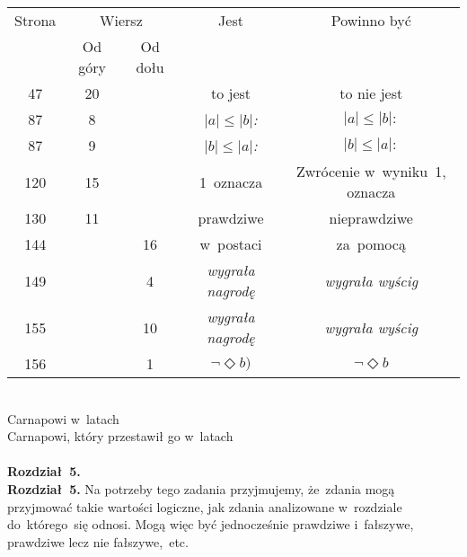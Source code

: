 \documentclass[a4paper,11pt]{article}
\numberwithin{equation}{section}
\begin{document}
\begin{center}

  \begin{tabular}{|c|c|c|c|c|}
    \hline
    Strona & \multicolumn{2}{c|}{Wiersz} & Jest
    & Powinno być \\ \cline{2-3}
    & Od góry & Od dołu & & \\
    \hline
    \hphantom{0}47 & 20 & & to jest & to nie jest \\
    \hphantom{0}87 & \hphantom{0}8 &
    & $| a | \!\! \leq | b |$\textit{:} & $| a | \leq | b |:$ \\
    \hphantom{0}87 & \hphantom{0}9 &
    & $| b | \!\! \leq | a |$\textit{:} & $| b | \leq | a |:$ \\
    120 & 15 & & 1~oznacza & Zwrócenie w~wyniku~1, oznacza \\
    130 & 11 & & prawdziwe & nieprawdziwe \\
    144 & & 16 & w~postaci & za~pomocą \\
    149 & & \hphantom{0}4 & \textit{wygrała nagrodę}
    & \textit{wygrała wyścig} \\
    155 & & 10 & \textit{wygrała nagrodę} & \textit{wygrała wyścig} \\
    156 & & \hphantom{0}1 & $\neg \Diamond b)$ & $\neg \Diamond b$ \\
    \hline
  \end{tabular}







\end{center}

\VerSpaceTwo


\noindent
{} \\
\Jest Carnapowi w~latach \\
\PowinnoByc Carnapowi, który przestawił go w~latach \\
 \\
\Jest \textbf{Rozdział~5.} \\
\PowinnoByc \textbf{Rozdział~5.} Na potrzeby tego zadania przyjmujemy,
że~zdania mogą przyjmować takie wartości logiczne, jak zdania analizowane
w~rozdziale do~którego~się odnosi. Mogą więc być jednocześnie prawdziwe
i~fałszywe, prawdziwe lecz nie fałszywe,~etc.
\end{document}
